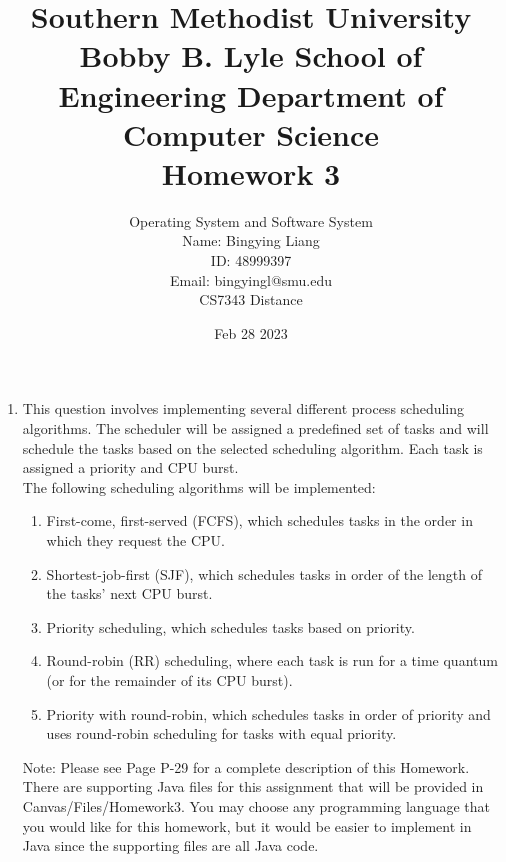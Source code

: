 \documentclass[12pt]{article}
\title{Southern Methodist University \\
Bobby B. Lyle School of Engineering Department of Computer Science \\
Homework 3
}
\author{Operating System and Software System \\
Name: Bingying Liang 
\\ ID: 48999397\\ 
Email: bingyingl@smu.edu \\ 
CS7343 Distance}
\date{Feb 28 2023}
\begin{document}
\maketitle
\begin{enumerate}
    \item This question involves implementing several different process scheduling algorithms. The scheduler will be assigned a predefined set of tasks and will schedule the tasks based on the selected scheduling algorithm. Each task is assigned a priority and CPU burst.\\
    The following scheduling algorithms will be implemented:
    \begin{enumerate}
        \item First-come, first-served (FCFS), which schedules tasks in the order in which they request the CPU.
        \item Shortest-job-first (SJF), which schedules tasks in order of the length of the tasks’ next CPU burst.
        \item Priority scheduling, which schedules tasks based on priority.
        \item Round-robin (RR) scheduling, where each task is run for a time quantum (or for the remainder of its CPU burst). 
        \item Priority with round-robin, which schedules tasks in order of priority and uses round-robin scheduling for tasks with equal priority.
    \end{enumerate}
    Note: Please see Page P-29 for a complete description of this Homework. There are supporting Java files for this assignment that will be provided in Canvas/Files/Homework3. You may choose any programming language that you would like for this homework, but it would be easier to implement in Java since the supporting files are all Java code. 
    

\end{enumerate}
\end{document}
